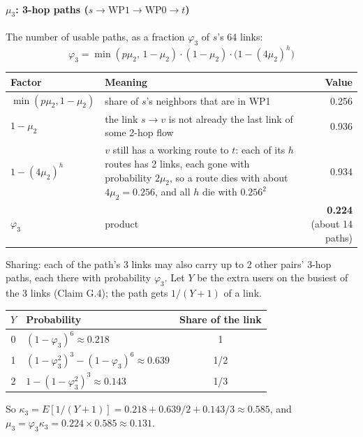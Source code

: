 \paragraph{$\mu_3$: 3-hop paths ($s \to \text{WP1} \to \text{WP0} \to t$)}

The number of usable paths, as a fraction $\varphi_3$ of $s$'s 64 links:
\[
\varphi_3 = \min(p \mu_2,\, 1 - \mu_2) \cdot (1 - \mu_2) \cdot \big(1 - (4 \mu_2)^h\big)
\]

\begin{center}
\begin{tabularx}{\linewidth}{@{}l L r@{}}
\toprule
Factor & Meaning & Value \\
\midrule
$\min(p\mu_2, 1 - \mu_2)$ & share of $s$'s neighbors that are in WP1 & 0.256 \\
$1 - \mu_2$ & the link $s \to v$ is not already the last link of some 2-hop flow & 0.936 \\
$1 - (4\mu_2)^h$ & $v$ still has a working route to $t$: each of its $h$ routes has 2 links, each gone with probability $2\mu_2$, so a route dies with about $4\mu_2 = 0.256$, and all $h$ die with $0.256^2$ & 0.934 \\
$\varphi_3$ & product & \textbf{0.224} (about 14 paths) \\
\bottomrule
\end{tabularx}
\end{center}

Sharing: each of the path's 3 links may also carry up to 2 other pairs' 3-hop paths, each there with probability $\varphi_3$. Let $Y$ be the extra users on the busiest of the 3 links (Claim G.4); the path gets $1/(Y+1)$ of a link.

\begin{center}
\begin{tabular}{@{}clc@{}}
\toprule
$Y$ & Probability & Share of the link \\
\midrule
0 & $(1 - \varphi_3)^6 \approx 0.218$ & 1 \\
1 & $(1 - \varphi_3^2)^3 - (1 - \varphi_3)^6 \approx 0.639$ & 1/2 \\
2 & $1 - (1 - \varphi_3^2)^3 \approx 0.143$ & 1/3 \\
\bottomrule
\end{tabular}
\end{center}

So $\kappa_3 = E[1/(Y+1)] = 0.218 + 0.639/2 + 0.143/3 \approx \mathbf{0.585}$, and $\mu_3 = \varphi_3 \kappa_3 = 0.224 \times 0.585 \approx \mathbf{0.131}$.

